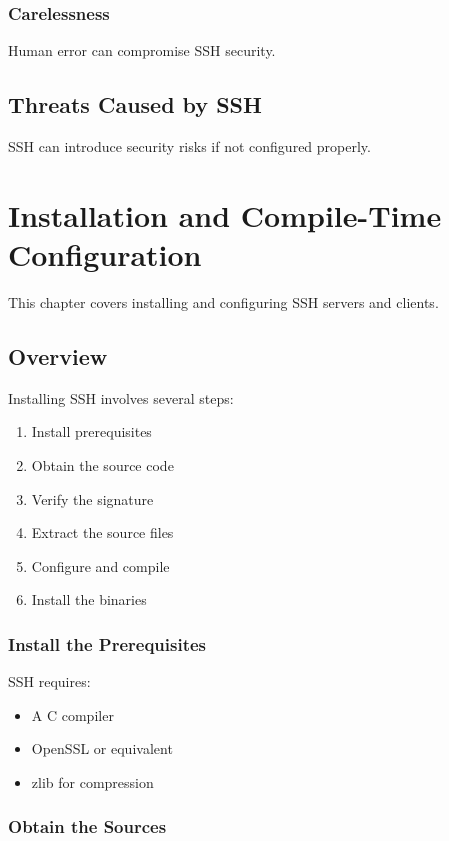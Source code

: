 \documentclass[12pt]{book}
\begin{document}
\subsection{Carelessness}

Human error can compromise SSH security.

\section{Threats Caused by SSH}

SSH can introduce security risks if not configured properly.

\chapter{Installation and Compile-Time Configuration}

This chapter covers installing and configuring SSH servers and clients.

\section{Overview}

Installing SSH involves several steps:

\begin{enumerate}
    \item Install prerequisites
    \item Obtain the source code
    \item Verify the signature
    \item Extract the source files
    \item Configure and compile
    \item Install the binaries
\end{enumerate}

\subsection{Install the Prerequisites}

SSH requires:
\begin{itemize}
    \item A C compiler
    \item OpenSSL or equivalent
    \item zlib for compression
\end{itemize}

\subsection{Obtain the Sources}
\end{document}
